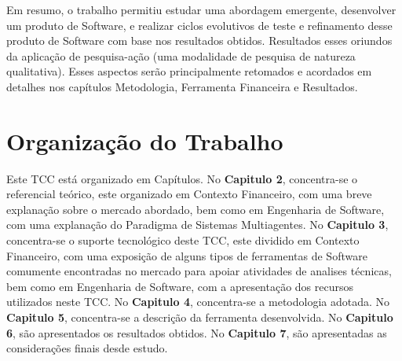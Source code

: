 Em resumo, o trabalho permitiu estudar uma abordagem emergente, desenvolver um produto de Software, e realizar ciclos evolutivos de teste e refinamento desse produto de Software com base nos resultados obtidos. Resultados esses oriundos da aplicação de pesquisa-ação \cite{rocha2012} (uma modalidade de pesquisa de natureza qualitativa). Esses aspectos serão principalmente retomados e acordados em detalhes nos capítulos Metodologia, Ferramenta Financeira e Resultados.

\section{Organização do Trabalho}

Este TCC está organizado em Capítulos. No \textbf{Capitulo 2}, concentra-se o referencial teórico, este organizado em Contexto Financeiro, com uma breve explanação sobre o mercado abordado, bem como em Engenharia de Software, com uma explanação do Paradigma de Sistemas Multiagentes. No \textbf{Capitulo 3}, concentra-se o suporte tecnológico deste TCC, este dividido em Contexto Financeiro, com uma exposição de alguns tipos de ferramentas de Software comumente encontradas no mercado para apoiar atividades de analises técnicas, bem como em Engenharia de Software, com a apresentação dos recursos utilizados neste TCC. No \textbf{Capitulo 4}, concentra-se a metodologia adotada. No \textbf{Capitulo 5}, concentra-se a descrição da ferramenta desenvolvida. No \textbf{Capitulo 6}, são apresentados os resultados obtidos. No \textbf{Capitulo 7}, são apresentadas as considerações finais desde estudo.




